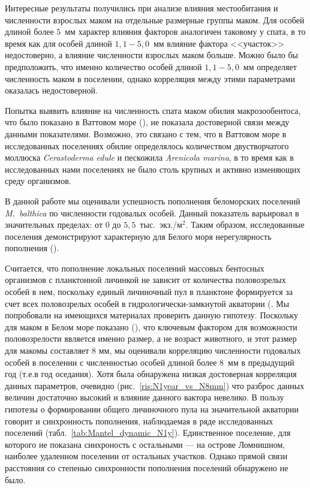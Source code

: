 Интересные результаты получились при анализе влияния местообитания и численности взрослых маком на отдельные размерные группы маком. 
Для особей длиной более $5$~мм характер влияния факторов аналогичен таковому у спата, в то время как для особей длиной $1,1 - 5,0$~мм влияние фактора <<участок>> недостоверно, а влияние численности взрослых маком больше. 
Можно было бы предположить, что именно количество особей длиной $1,1 - 5,0$~мм определяет численность маком в поселении, однако корреляция между этими параметрами оказалась недостоверной.

Попытка выявить влияние на численность спата маком обилия макрозообентоса, что было показано в Ваттовом море (\cite{Flatch_2003}), не показала достоверной связи между данными показателями. 
Возможно, это связано с тем, что в Ваттовом море в исследованных поселениях обилие определялось количеством двустворчатого моллюска \textit{Cerastoderma edule} и пескожила \textit{Arenicola marina}, в то время как в исследованных нами поселениях не было столь крупных и активно изменяющих среду организмов. 

\par\bigskip
В данной работе мы оценивали успешность пополнения беломорских поселений \textit{M.~balthica} по численности годовалых особей.
Данный показатель варьировал в значительных пределах: от $0$ до $5,5$~тыс.~экз./м$^2$.
Таким образом, исследованные поселения демонстрируют характерную для Белого моря нерегулярность пополнения (\cite{Maximovich_et_al_1991, Maximovich_Gerasimova_2004, Gerasimova_Maximovich_2009}).

Считается, что пополнение локальных поселений массовых бентосных организмов с планктонной личинкой не зависит от количества половозрелых особей в нем, поскольку единый личиночный пул в планктоне формируется за счет всех половозрелых особей в гидрологически-замкнутой акватории (\cite{Maximovich_Shilin_2012}.
Мы попробовали на имеющихся материалах проверить данную гипотезу.
Поскольку для маком в Белом море показано (\cite{Semenova_1980, Maximovich_1985}), что ключевым фактором для возможности половозрелости является именно размер, а не возраст животного, и этот размер для макомы составляет 8 мм, мы оценивали корреляцию численности годовалых особей в поселении с численностью особей длиной более $8$~мм в предыдущий год (т.е.в год оседания).
Хотя была обнаружена низкая достоверная корреляция данных параметров, очевидно (рис.~\ref{ris:N1year_vs_N8mm}) что разброс данных величин достаточно высокий и влияние данного вактора невелико.
В пользу гипотезы о формировании общего личиночного пула на значительной акватории говорит и синхронность пополнения, наблюдаемая в ряде исследованных поселений (табл.~\ref{tab:Mantel_dynamic_N1y}).
Единственное поселение, для которого не показана синхроность с остальными --- на острове Ломнишном, наиболее удаленном поселении от остальных участков.
Однако прямой связи расстояния со степенью синхронности пополнения поселений обнаружено не было.

